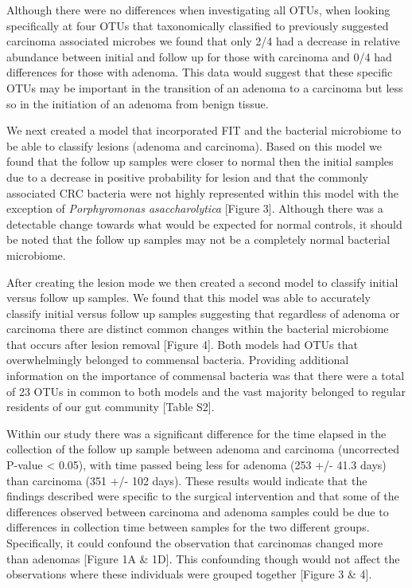 \documentclass[12pt,]{article}
\begin{document}
Although there were no differences when investigating all OTUs, when
looking specifically at four OTUs that taxonomically classified to
previously suggested carcinoma associated microbes we found that only
2/4 had a decrease in relative abundance between initial and follow up
for those with carcinoma and 0/4 had differences for those with adenoma.
This data would suggest that these specific OTUs may be important in the
transition of an adenoma to a carcinoma but less so in the initiation of
an adenoma from benign tissue.

We next created a model that incorporated FIT and the bacterial
microbiome to be able to classify lesions (adenoma and carcinoma). Based
on this model we found that the follow up samples were closer to normal
then the initial samples due to a decrease in positive probability for
lesion and that the commonly associated CRC bacteria were not highly
represented within this model with the exception of \emph{Porphyromonas
asaccharolytica} {[}Figure 3{]}. Although there was a detectable change
towards what would be expected for normal controls, it should be noted
that the follow up samples may not be a completely normal bacterial
microbiome.

After creating the lesion mode we then created a second model to
classify initial versus follow up samples. We found that this model was
able to accurately classify initial versus follow up samples suggesting
that regardless of adenoma or carcinoma there are distinct common
changes within the bacterial microbiome that occurs after lesion removal
{[}Figure 4{]}. Both models had OTUs that overwhelmingly belonged to
commensal bacteria. Providing additional information on the importance
of commensal bacteria was that there were a total of 23 OTUs in common
to both models and the vast majority belonged to regular residents of
our gut community {[}Table S2{]}.

Within our study there was a significant difference for the time elapsed
in the collection of the follow up sample between adenoma and carcinoma
(uncorrected P-value \textless{} 0.05), with time passed being less for
adenoma (253 +/- 41.3 days) than carcinoma (351 +/- 102 days). These
results would indicate that the findings described were specific to the
surgical intervention and that some of the differences observed between
carcinoma and adenoma samples could be due to differences in collection
time between samples for the two different groups. Specifically, it
could confound the observation that carcinomas changed more than
adenomas {[}Figure 1A \& 1D{]}. This confounding though would not affect
the observations where these individuals were grouped together {[}Figure
3 \& 4{]}.
\end{document}

